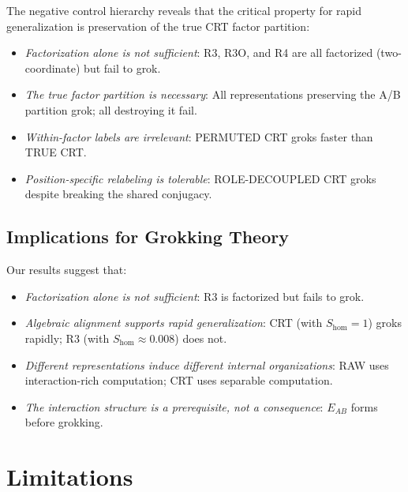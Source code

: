 \documentclass[11pt,a4paper]{article}
\theoremstyle{definition}
\theoremstyle{remark}
\newcommand{\Shom}{S_{\mathrm{hom}}}
\newcommand{\EAB}{E_{AB}}
\begin{document}
The negative control hierarchy reveals that the critical property for rapid generalization is preservation of the true CRT factor partition:
\begin{itemize}[leftmargin=*]
    \item \emph{Factorization alone is not sufficient}: R3, R3O, and R4 are all factorized (two-coordinate) but fail to grok.
    \item \emph{The true factor partition is necessary}: All representations preserving the A/B partition grok; all destroying it fail.
    \item \emph{Within-factor labels are irrelevant}: PERMUTED CRT groks faster than TRUE CRT.
    \item \emph{Position-specific relabeling is tolerable}: ROLE-DECOUPLED CRT groks despite breaking the shared conjugacy.
\end{itemize}

\subsection{Implications for Grokking Theory}

Our results suggest that:
\begin{itemize}[leftmargin=*]
    \item \emph{Factorization alone is not sufficient}: R3 is factorized but fails to grok.
    \item \emph{Algebraic alignment supports rapid generalization}: CRT (with $\Shom = 1$) groks rapidly; R3 (with $\Shom \approx 0.008$) does not.
    \item \emph{Different representations induce different internal organizations}: RAW uses interaction-rich computation; CRT uses separable computation.
    \item \emph{The interaction structure is a prerequisite, not a consequence}: $\EAB$ forms before grokking.
\end{itemize}

\section{Limitations}
\end{document}
